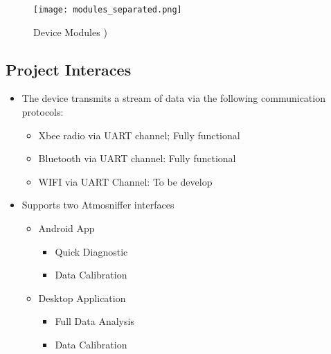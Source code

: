 \begin{figure}[h]
\centering
\texttt{[image: modules\_separated.png]}
 \caption{Device Modules \cite{weber})}
 \label{fig:device_modules}
\end{figure}

\newpage \subsection{Project Interaces}
\begin{itemize}
\item The device transmits a stream of data via the following communication protocols:
	\begin{itemize}
	\item Xbee radio via UART channel; Fully functional
	\item Bluetooth via UART channel: Fully functional
	\item WIFI via UART Channel: To be develop
	\end{itemize}
\item Supports two Atmosniffer interfaces
	\begin{itemize}
	\item Android App
		\begin{itemize}
		\item Quick Diagnostic
		\item Data Calibration
		\end{itemize}
	\item Desktop Application
		\begin{itemize}
		\item Full Data Analysis
		\item Data Calibration
		\end{itemize}
	\end{itemize}
\end{itemize}

